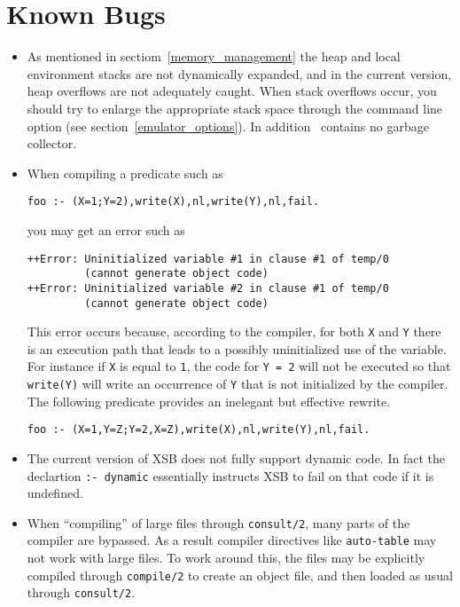 \section{Known Bugs}

\begin{itemize}
\item As mentioned in sectiom~\ref{memory_management} the heap and
      local environment stacks are not dynamically expanded, and in
      the current version, heap overflows are not adequately caught.
      When stack overflows occur, you should try to enlarge the
      appropriate stack space through the command line option (see
      section~\ref{emulator_options}).  In addition \version\ contains
      no garbage collector.
\item When compiling a predicate such as
\begin{verbatim}
foo :- (X=1;Y=2),write(X),nl,write(Y),nl,fail.
\end{verbatim}
you may get an error such as
\begin{verbatim}
++Error: Uninitialized variable #1 in clause #1 of temp/0
         (cannot generate object code)
++Error: Uninitialized variable #2 in clause #1 of temp/0
         (cannot generate object code)
\end{verbatim}
This error occurs because, according to the compiler, for both {\tt X}
and {\tt Y} there is an execution path that leads to a possibly
uninitialized use of the variable.  For instance if {\tt X} is equal
to {\tt 1}, the code for {\tt Y = 2} will not be executed so that {\tt
write(Y)} will write an occurrence of {\tt Y} that is not initialized
by the compiler.  The following predicate provides an inelegant but
effective rewrite.
\begin{verbatim}
foo :- (X=1,Y=Z;Y=2,X=Z),write(X),nl,write(Y),nl,fail.
\end{verbatim}
\item The current version of XSB does not fully support dynamic code.
In fact the declartion {\tt :- dynamic} essentially instructs XSB to
fail on that code if it is undefined.
%
\item When ``compiling'' of large files through {\tt consult/2}, many
      parts of the compiler are bypassed.  As a result compiler
      directives like {\tt auto-table} may not work with large files.
      To work around this, the files may be explicitly compiled
      through {\tt compile/2} to create an object file, and then
      loaded as usual through {\tt consult/2}.

\end{itemize}
